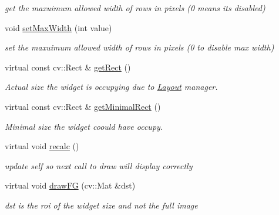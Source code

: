 \begin{DoxyCompactItemize}
\begin{DoxyCompactList}\small\item\em get the maxuimum allowed width of rows in pixels (0 means it\textquotesingle{}s disabled) \end{DoxyCompactList}\item 
void \hyperlink{classcanvascv_1_1Text_a6062c0756aceec5d6fe8f233173e4b03}{set\+Max\+Width} (int value)\hypertarget{classcanvascv_1_1Text_a6062c0756aceec5d6fe8f233173e4b03}{}\label{classcanvascv_1_1Text_a6062c0756aceec5d6fe8f233173e4b03}

\begin{DoxyCompactList}\small\item\em set the maxuimum allowed width of rows in pixels (0 to disable max width) \end{DoxyCompactList}\item 
virtual const cv\+::\+Rect \& \hyperlink{classcanvascv_1_1Text_a3b2c63327230c5763fe4262a804c41d0}{get\+Rect} ()\hypertarget{classcanvascv_1_1Text_a3b2c63327230c5763fe4262a804c41d0}{}\label{classcanvascv_1_1Text_a3b2c63327230c5763fe4262a804c41d0}

\begin{DoxyCompactList}\small\item\em Actual size the widget is occupying due to \hyperlink{classcanvascv_1_1Layout}{Layout} manager. \end{DoxyCompactList}\item 
virtual const cv\+::\+Rect \& \hyperlink{classcanvascv_1_1Text_a0cfed8ed9879101479795710dac4b1f2}{get\+Minimal\+Rect} ()\hypertarget{classcanvascv_1_1Text_a0cfed8ed9879101479795710dac4b1f2}{}\label{classcanvascv_1_1Text_a0cfed8ed9879101479795710dac4b1f2}

\begin{DoxyCompactList}\small\item\em Minimal size the widget coould have occupy. \end{DoxyCompactList}\item 
virtual void \hyperlink{classcanvascv_1_1Text_a94ccca8b1e03869a73699617a8c7f189}{recalc} ()\hypertarget{classcanvascv_1_1Text_a94ccca8b1e03869a73699617a8c7f189}{}\label{classcanvascv_1_1Text_a94ccca8b1e03869a73699617a8c7f189}

\begin{DoxyCompactList}\small\item\em update self so next call to \textquotesingle{}draw\textquotesingle{} will display correctly \end{DoxyCompactList}\item 
virtual void \hyperlink{classcanvascv_1_1Text_a2790e0fe1541df82c97879d393de687f}{draw\+FG} (cv\+::\+Mat \&dst)\hypertarget{classcanvascv_1_1Text_a2790e0fe1541df82c97879d393de687f}{}\label{classcanvascv_1_1Text_a2790e0fe1541df82c97879d393de687f}

\begin{DoxyCompactList}\small\item\em dst is the roi of the widget size and not the full image \end{DoxyCompactList}\end{DoxyCompactItemize}
